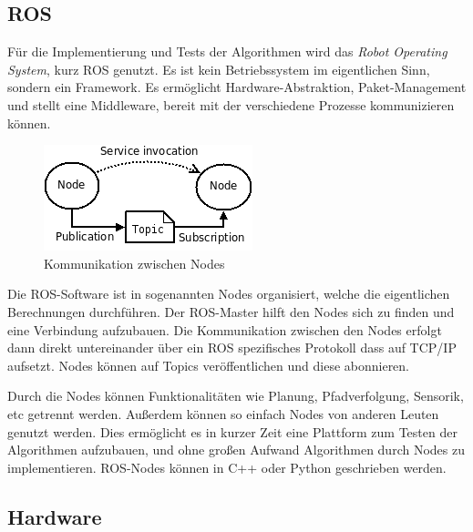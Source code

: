 \documentclass[11pt,a4paper]{article}
\begin{document}
{\subsection{ROS}


F\"ur die Implementierung und Tests der Algorithmen wird das \textit{Robot Operating System}, kurz ROS genutzt. Es ist kein Betriebssystem im eigentlichen Sinn, sondern ein Framework. Es erm\"oglicht Hardware-Abstraktion, Paket-Management und stellt eine Middleware, bereit mit der verschiedene Prozesse kommunizieren k\"onnen. \cite{rosWiki}

\begin{figure}[h]
	\includegraphics[width=\linewidth]{pictures/ROS_basic_concepts.png}
	\caption{Kommunikation zwischen Nodes}
\end{figure}

Die ROS-Software ist in sogenannten Nodes organisiert, welche die eigentlichen Berechnungen durchf\"uhren. Der ROS-Master hilft den Nodes sich zu finden und eine Verbindung aufzubauen. Die Kommunikation zwischen den Nodes erfolgt dann direkt untereinander über ein ROS spezifisches Protokoll dass auf TCP/IP aufsetzt. Nodes k\"onnen auf Topics ver\"offentlichen und diese abonnieren. \cite{rosConcepts}

Durch die Nodes k\"onnen Funktionalit\"aten wie Planung, Pfadverfolgung, Sensorik, etc getrennt werden. Au{\ss}erdem k\"onnen so einfach Nodes von anderen Leuten genutzt werden. Dies erm\"oglicht es in kurzer Zeit eine Plattform zum Testen der Algorithmen aufzubauen, und ohne gro{\ss}en Aufwand Algorithmen durch Nodes zu implementieren. ROS-Nodes k\"onnen in C++ oder Python geschrieben werden.

\subsection{Hardware}

}
\end{document}
